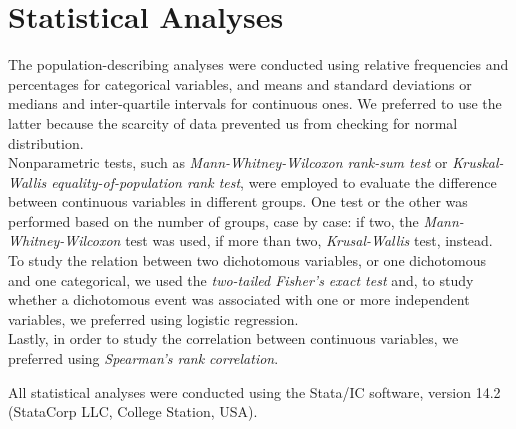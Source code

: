 
\section{Statistical Analyses}\label{sec:statisticalanalyses}
The population-describing analyses were conducted using relative frequencies and percentages for categorical variables, and means and standard deviations or medians and inter-quartile intervals for continuous ones. We preferred to use the latter because the scarcity of data prevented us from checking for normal distribution.\\
Nonparametric tests, such as \textit{Mann-Whitney-Wilcoxon rank-sum test} or \textit{Kruskal-Wallis equality-of-population rank test}, were employed to evaluate the difference between continuous variables in different groups. One test or the other was performed based on the number of groups, case by case: if two, the \textit{Mann-Whitney-Wilcoxon} test was used, if more than two, \textit{Krusal-Wallis} test, instead. To study the relation between two dichotomous variables, or one dichotomous and one categorical, we used the \textit{two-tailed Fisher's exact test} and, to study whether a dichotomous event was associated with one or more independent variables, we preferred using logistic regression.\\
Lastly, in order to study the correlation between continuous variables, we preferred using \textit{Spearman's rank correlation}.

All statistical analyses were conducted using the Stata/IC software, version 14.2 (StataCorp LLC, College Station, USA).